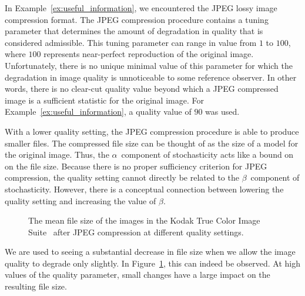 \begin{example}
  In Example~\ref{ex:useful_information}, we encountered the JPEG lossy image compression format.
  The JPEG compression procedure contains a tuning parameter that determines the amount of degradation in quality that is considered admissible.
  This tuning parameter can range in value from $1$ to $100$, where $100$ represents near-perfect reproduction of the original image.
  Unfortunately, there is no unique minimal value of this parameter for which the degradation in image quality is unnoticeable to some reference observer.
  In other words, there is no clear-cut quality value beyond which a JPEG compressed image is a sufficient statistic for the original image.
  For Example~\ref{ex:useful_information}, a quality value of $90$ was used.

  With a lower quality setting, the JPEG compression procedure is able to produce smaller files.
  The compressed file size can be thought of as the size of a model for the original image.
  Thus, the $\alpha$~component of stochasticity acts like a bound on on the file size.
  Because there is no proper sufficiency criterion for JPEG compression, the quality setting cannot directly be related to the $\beta$~component of stochasticity.
  However, there is a conceptual connection between lowering the quality setting and increasing the value of $\beta$.

  \begin{figure}
    \centering
    \caption{
      The mean file size of the images in the Kodak True Color Image Suite~\parencite{franzen1999kodak} after JPEG compression at different quality settings.
    }
    \label{fig:jpeg_q}
  \end{figure}
  We are used to seeing a substantial decrease in file size when we allow the image quality to degrade only slightly.
  In Figure~\ref{fig:jpeg_q}, this can indeed be observed.
  At high values of the quality parameter, small changes have a large impact on the resulting file size.
\end{example}

